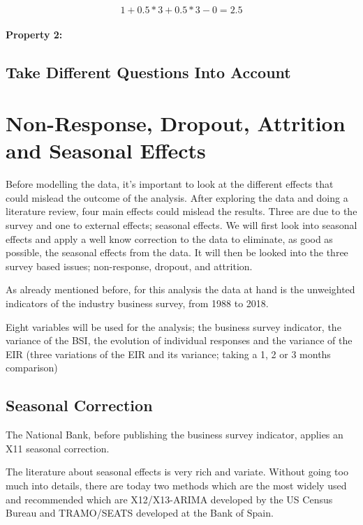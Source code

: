 \documentclass[12pt,a4paper,oneside]{book}
\begin{document}
\begin{equation}
    1+ 0.5*3 + 0.5*3 - 0 = 2.5
\end{equation}

\subsubsection{Property 2: }

\section{Take Different Questions Into Account}




\chapter{Non-Response, Dropout, Attrition and Seasonal Effects}
\label{chap:nonresponse dropout}

Before modelling the data, it's important to look at the different effects that could mislead the outcome of the analysis. After exploring the data and doing a literature review, four main effects could mislead the results. Three are due to the survey and one to external effects; seasonal effects. We will first look into seasonal effects and apply a well know correction to the data to eliminate, as good as possible, the seasonal effects from the data.
It will then be looked into the three survey based issues; non-response, dropout, and attrition.

As already mentioned before, for this analysis the data at hand is the unweighted indicators of the industry business survey, from 1988 to 2018.

Eight variables will be used for the analysis; the business survey indicator, the variance of the BSI, the evolution of individual responses and the variance of the EIR (three variations of the EIR and its variance; taking a 1, 2 or 3 months comparison) 

\section{Seasonal Correction}
\label{sec:seasonal correction}

The National Bank, before publishing the business survey indicator, applies an X11 seasonal correction.

The literature about seasonal effects is very rich and variate. Without going too much into details, there are today two methods which are the most widely used and recommended which are X12/X13-ARIMA developed by the US Census Bureau and TRAMO/SEATS developed at the Bank of Spain. 
\end{document}
